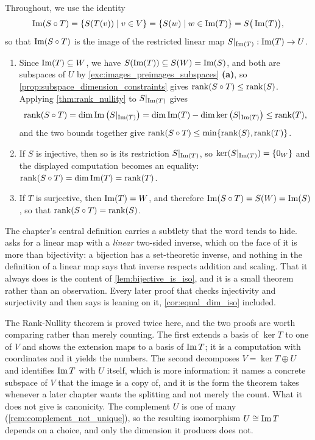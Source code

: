 \begin{exercisesolution}
\label{sol:rank_of_composition}
Throughout, we use the identity
\[
\operatorname{Im}(S \circ T) = \{S(T(v)) \mid v \in V\} = \{S(w) \mid w \in \operatorname{Im}(T)\} = S\big(\operatorname{Im}(T)\big),
\]
so that $\operatorname{Im}(S \circ T)$ is the image of the restricted linear map $S|_{\operatorname{Im}(T)}: \operatorname{Im}(T) \to U$.

\begin{enumerate}[label=\textbf{(\alph*)}]
    \item Since $\operatorname{Im}(T) \subseteq W$, we have $S(\operatorname{Im}(T)) \subseteq S(W) = \operatorname{Im}(S)$, and both are subspaces of $U$ by \cref{exc:images_preimages_subspaces} \textbf{(a)}, so \cref{prop:subspace_dimension_constraints} gives $\operatorname{rank}(S \circ T) \le \operatorname{rank}(S)$. Applying \cref{thm:rank_nullity} to $S|_{\operatorname{Im}(T)}$ gives
    \[
    \operatorname{rank}(S \circ T) = \dim \operatorname{Im}\big(S|_{\operatorname{Im}(T)}\big) = \dim \operatorname{Im}(T) - \dim \ker\big(S|_{\operatorname{Im}(T)}\big) \le \operatorname{rank}(T),
    \]
    and the two bounds together give $\operatorname{rank}(S \circ T) \le \min\{\operatorname{rank}(S), \operatorname{rank}(T)\}$.
    \item If $S$ is injective, then so is its restriction $S|_{\operatorname{Im}(T)}$, so $\ker(S|_{\operatorname{Im}(T)}) = \{0_W\}$ and the displayed computation becomes an equality: $\operatorname{rank}(S \circ T) = \dim \operatorname{Im}(T) = \operatorname{rank}(T)$.
    \item If $T$ is surjective, then $\operatorname{Im}(T) = W$, and therefore $\operatorname{Im}(S \circ T) = S(W) = \operatorname{Im}(S)$, so that $\operatorname{rank}(S \circ T) = \operatorname{rank}(S)$. \qedhere
\end{enumerate}
\end{exercisesolution}



\begin{ainote}
The chapter's central definition carries a subtlety that the word
 tends to hide.  asks for a linear map
with a \emph{linear} two-sided inverse, which on the face of it is more than
bijectivity: a bijection has a set-theoretic inverse, and nothing in the
definition of a linear map says that inverse respects addition and scaling.
That it always does is the content of \cref{lem:bijective_is_iso}, and it is a
small theorem rather than an observation. Every later proof that checks
injectivity and surjectivity and then says  is leaning on it,
\cref{cor:equal_dim_iso} included.

The Rank-Nullity theorem is proved twice here, and the two proofs are worth
comparing rather than merely counting. The first extends a basis of $\ker T$ to
one of $V$ and shows the extension maps to a basis of $\operatorname{Im} T$; it is a
computation with coordinates and it yields the numbers. The second decomposes
$V = \ker T \oplus U$ and identifies $\operatorname{Im} T$ with $U$ itself, which is more
information: it names a concrete subspace of $V$ that the image is a copy of,
and it is the form the theorem takes whenever a later chapter wants the
splitting and not merely the count. What it does not give is canonicity. The
complement $U$ is one of many (\cref{rem:complement_not_unique}), so the
resulting isomorphism $U \cong \operatorname{Im} T$ depends on a choice, and only the
dimension it produces does not.
\end{ainote}


